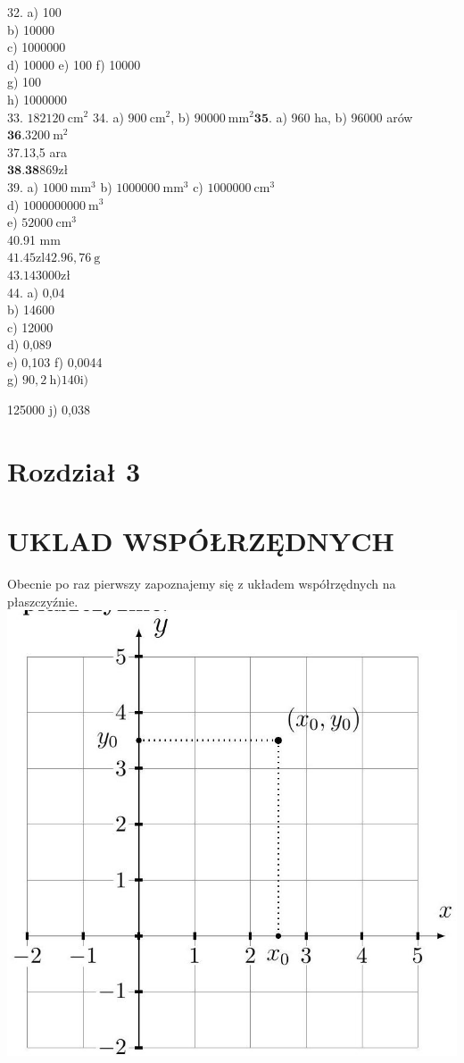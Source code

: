 \documentclass[10pt]{article}
\begin{document}
32. a) 100\\
b) 10000\\
c) 1000000\\
d) 10000 e) 100 f) 10000\\
g) 100\\
h) 1000000\\
33. \(182120 \mathrm{~cm}^{2}\) 34. a) \(900 \mathrm{~cm}^{2}\), b) \(90000 \mathrm{~mm}^{2} \mathbf{3 5}\). a) 960 ha, b) 96000 arów \(\mathbf{3 6 .} 3200 \mathrm{~m}^{2}\)\\
37.13,5 ara\\
\(\mathbf{3 8 . 3 8} 869 \mathrm{zł}\)\\
39. a) \(1000 \mathrm{~mm}^{3}\) b) \(1000000 \mathrm{~mm}^{3}\) c) \(1000000 \mathrm{~cm}^{3}\)\\
d) \(1000000000 \mathrm{~m}^{3}\)\\
e) \(52000 \mathrm{~cm}^{3}\)\\
40.91 mm\\
\(41.45 \mathrm{zl} 42.96,76 \mathrm{~g}\)\\
\(43.143000 \mathrm{zł}\)\\
44. a) 0,04\\
b) 14600\\
c) 12000\\
d) 0,089\\
e) 0,103 f) 0,0044\\
g) \(90,2 \mathrm{~h}) 140 \mathrm{i})\)

125000 j) 0,038

\section*{Rozdział 3}
\section*{UKLAD WSPÓŁRZĘDNYCH}
Obecnie po raz pierwszy zapoznajemy się z układem współrzędnych na płaszczyźnie.\\
\includegraphics[max width=\textwidth, center]{2024_11_21_8f01584889ff06348ae7g-064}
\end{document}
